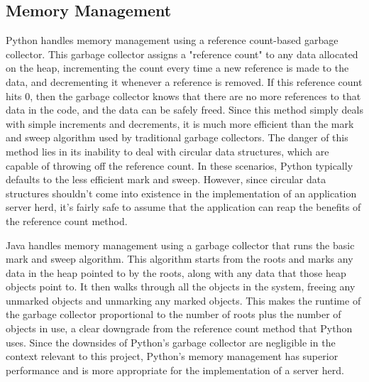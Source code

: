 \subsection{Memory Management}
\par
Python handles memory management using a reference count-based garbage
collector. This garbage collector assigns a "reference count" to any data
allocated on the heap, incrementing the count every time a new reference is made
to the data, and decrementing it whenever a reference is removed. If this
reference count hits 0, then the garbage collector knows that there are no more
references to that data in the code, and the data can be safely freed. Since
this method simply deals with simple increments and decrements, it is much more
efficient than the mark and sweep algorithm used by traditional garbage
collectors. The danger of this method lies in its inability to deal with
circular data structures, which are capable of throwing off the reference count.
In these scenarios, Python typically defaults to the less efficient mark and
sweep. However, since circular data structures shouldn't come into existence
in the implementation of an application server herd, it's fairly safe to assume
that the application can reap the benefits of the reference count method.
\par
Java handles memory management using a garbage collector that runs the basic
mark and sweep algorithm. This algorithm starts from the roots and marks any
data in the heap pointed to by the roots, along with any data that those heap
objects point to. It then walks through all the objects in the system, freeing
any unmarked objects and unmarking any marked objects. This makes the runtime
of the garbage collector proportional to the number of roots plus the number of
objects in use, a clear downgrade from the reference count method that Python
uses. Since the downsides of Python's garbage collector are negligible in the
context relevant to this project, Python's memory management has superior
performance and is more appropriate for the implementation of a server herd.

